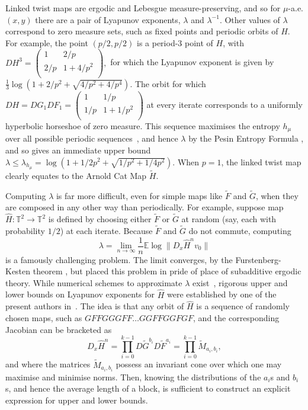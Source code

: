 \documentclass{iopart}
\newcommand{\rob}[1]{\textcolor{blue}{\bf rob: #1}}
\begin{document}
Linked twist maps are ergodic \cite{burton1980ergodicity} and Lebesgue measure-preserving, and so for $\mu$-a.e. $(x,y)$ there are a pair of Lyapunov exponents, $\lambda$ and $\lambda^{-1}$. Other values of $\lambda$ correspond to zero measure sets, such as fixed points and periodic orbits of $H$. For example, the point $(p/2,p/2)$ is a period-3 point of $H$, with $DH^3 =  \left(\begin{array}{cc}
1 & 2/p \\
2/p & 1+4/p^2 \\
\end{array}\right),$ for which the Lyapunov exponent is given by $\frac{1}{3} \log (1+2/p^2 + \sqrt{4/p^2+4/p^4})$. The orbit for which $DH=DG_1DF_1 =  \left(\begin{array}{cc}
1 & 1/p \\
1/p & 1+1/p^2 \\
\end{array}\right)$ at every iterate corresponds to a uniformly hyperbolic horseshoe of zero measure. This sequence 
 maximises the entropy $h_{\mu}$ over all possible periodic sequences~\cite{DAlessandro1999}, and hence $\lambda$ by the Pesin Entropy Formula \cite{pesin1977characteristic}, and so gives an immediate upper bound $\lambda \le \lambda_{h_{\mu}} = \log(1+1/2p^2 + \sqrt{1/p^2+1/4p^2})$. When $p=1$, the linked twist map clearly equates to the Arnold Cat Map $\tilde{H}$.


Computing $\lambda$ is far more difficult, even for simple maps like $\tilde{F}$ and $\tilde{G}$, when they are composed in any other way than periodically. For example, suppose map $\hat{H} : \mathbb{T}^2 \to \mathbb{T}^2$ is defined by choosing either $\tilde{F}$ or $\tilde{G}$ at random (say, each with probability $1/2$) at each iterate. Because $\tilde{F}$ and $\tilde{G}$ do not commute, computing 
$$
\lambda = \lim_{n \to \infty} \frac{1}{n} \mathbb{E} \log \| D_x \hat{H}^n v_0\|
$$
is a famously challenging problem. The limit converges, by the Furstenberg-Kesten theorem \cite{furstenberg_products_1960}, but \cite{kingman_subadditive_1973} placed this problem in pride of place of subadditive ergodic theory. While numerical schemes to approximate $\lambda$ exist~\cite{parker2012practical}, rigorous upper and lower bounds on Lyapunov exponents for $\hat{H}$ were established by one of the present authors in~\cite{sturman2019lyapunov}. The idea is that any orbit of $\hat{H}$ is a sequence of randomly chosen maps, such as $GFFGGGFF \ldots GGFFGGFGF$, and the corresponding Jacobian can be bracketed as
$$
D_x \hat{H}^n = \prod_{i=0}^{k-1}  D\tilde{G}^{b_i}D\tilde{F}^{a_i} = \prod_{i=0}^{k-1} \tilde{M}_{a_i,b_i} ,
$$
and where the matrices $\tilde{M}_{a_i,b_i}$ possess an invariant cone over which one may maximise and minimise norms. Then, knowing the distributions of the $a_i$s and $b_i$s, and hence the average length of a block, is sufficient to construct an explicit expression for upper and lower bounds. 
\end{document}
